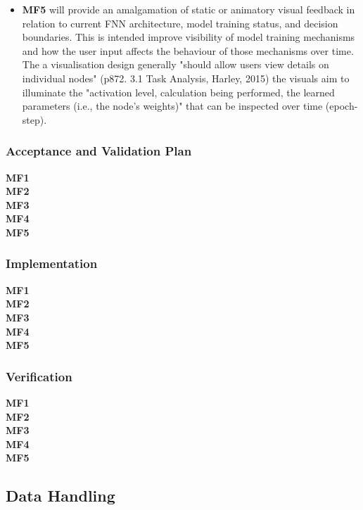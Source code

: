 \documentclass{article}
\begin{document}
\begin{itemize}
\item \textbf{MF5} will provide an amalgamation of static or animatory visual feedback in relation to current FNN architecture, model training status, and decision boundaries. This is intended improve visibility of model training mechanisms and how the user input affects the behaviour of those mechanisms over time. The a visualisation design generally "should allow users view details on individual nodes" (p872. 3.1 Task Analysis, Harley, 2015) the visuals aim to illuminate the "activation level, calculation being performed, the learned parameters (i.e., the node's weights)" that can be inspected over time (epoch-step).
\end{itemize}

\subsubsection{Acceptance and Validation Plan}
\textbf{MF1} \mbox{} \\
\textbf{MF2} \mbox{} \\
\textbf{MF3} \mbox{} \\
\textbf{MF4} \mbox{} \\
\textbf{MF5} \mbox{} \\

\subsubsection{Implementation}
\textbf{MF1} \mbox{} \\
\textbf{MF2} \mbox{} \\
\textbf{MF3} \mbox{} \\
\textbf{MF4} \mbox{} \\
\textbf{MF5} \mbox{} \\

\subsubsection{Verification}
\textbf{MF1} \mbox{} \\
\textbf{MF2} \mbox{} \\
\textbf{MF3} \mbox{} \\
\textbf{MF4} \mbox{} \\
\textbf{MF5} \mbox{} \\




\subsection{Data Handling}
\end{document}
